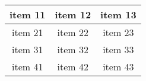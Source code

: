 \documentclass{article}
\begin{document}
\begin{tabular}{|c|c|c|}
  \toprule[2pt]
 item 11 & item 12 & item 13 \\\hline
 item 21 & item 22 & item 23 \\\cline{1-2}
 item 31 & item 32 & item 33 \\\cmidrule[2pt](r){2-3}
 item 41 & item 42 & item 43 \\
  \bottomrule[2pt]
\end{tabular}
\end{document}
